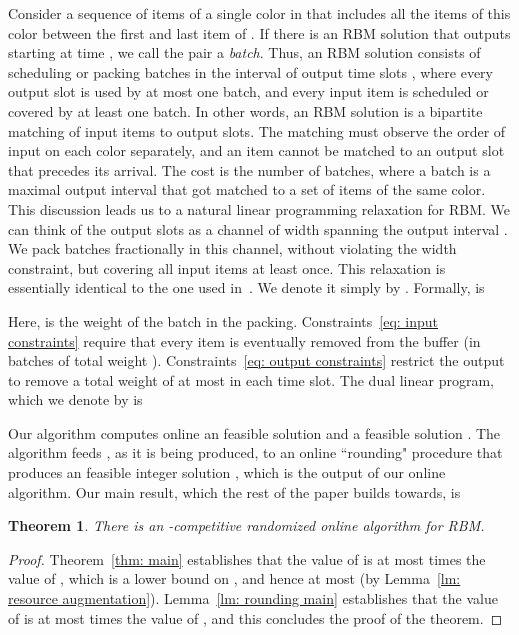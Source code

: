 \documentclass[12pt]{article}
\newtheorem{theorem}{Theorem}[section]
\begin{document}
Consider a sequence  of items of a single color  in 
 that includes all the items of this color between
the first and last item of . If there is an RBM solution
that outputs  starting at time , we call the pair 
a {\em batch}. Thus, an RBM solution consists of scheduling
or packing batches in the interval of output time slots
, where every output slot is used by at most
one batch, and every input item is scheduled or covered
by at least one batch. In other words, an RBM solution
is a bipartite matching of input items to output slots. The
matching must observe the order of input on each color
separately, and an item cannot be matched to an output
slot that precedes its arrival. The cost is the number of batches, where
a batch is a maximal output interval that got matched to
a set of items of the same color. This discussion leads us
to a natural linear programming relaxation for RBM. We
can think of the output slots as a channel of width 
spanning the output interval .
We pack batches fractionally in this channel, without
violating the width constraint, but covering all input items 
at least once. This relaxation is essentially identical to the
one used in~\cite{AR10,AR13}. We denote it simply by
. Formally,  is

Here,  is the weight of the batch  in the packing.
Constraints~\eqref{eq: input constraints} require that every item
is eventually removed from the buffer (in batches of total weight
). Constraints~\eqref{eq: output constraints} restrict the output
to remove a total weight of at most  in each time slot.
The dual linear program, which we denote by  is


Our algorithm computes online an  feasible solution
 and a  feasible solution . The algorithm
feeds , as it is being produced, to an online ``rounding"
procedure that produces an  feasible integer solution
, which is the output of our online algorithm. Our
main result, which the rest of the paper builds towards, is
\begin{theorem}
There is an -competitive randomized online
algorithm for RBM.
\end{theorem}

\begin{proof}
Theorem~\ref{thm: main} establishes that the value of 
is at most  times the value of , which
is a lower bound on , and hence at most
 (by Lemma~\ref{lm: resource augmentation}). 
Lemma~\ref{lm: rounding main} establishes that
the value of  is at most  times the value
of , and this concludes the proof of the theorem.
\end{proof}
\end{document}
